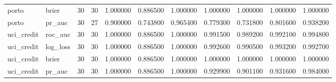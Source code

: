 \begin{longtable}{llrrrrrrrrr}
porto & brier & 30 & 30 & 1.000000 & 0.886500 & 1.000000 & 1.000000 & 1.000000 & 1.000000 & 1.000000 \\
porto & pr\_auc & 30 & 27 & 0.900000 & 0.743800 & 0.965400 & 0.779300 & 0.731800 & 0.801600 & 0.938200 \\
uci\_credit & roc\_auc & 30 & 30 & 1.000000 & 0.886500 & 1.000000 & 0.991500 & 0.989200 & 0.992100 & 0.994800 \\
uci\_credit & log\_loss & 30 & 30 & 1.000000 & 0.886500 & 1.000000 & 0.992600 & 0.990500 & 0.993200 & 0.992700 \\
uci\_credit & brier & 30 & 30 & 1.000000 & 0.886500 & 1.000000 & 1.000000 & 1.000000 & 1.000000 & 1.000000 \\
uci\_credit & pr\_auc & 30 & 30 & 1.000000 & 0.886500 & 1.000000 & 0.929900 & 0.901100 & 0.931600 & 0.984000 \\
\end{longtable}\endgroup\addtocounter{table}{-1}
